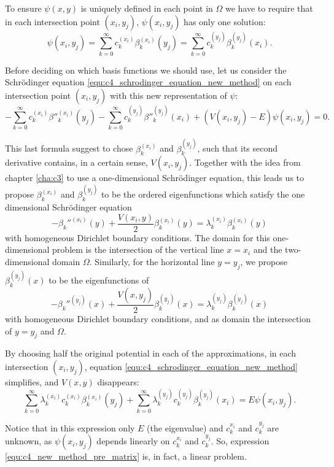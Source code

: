 To ensure $\psi(x, y)$ is uniquely defined in each point in $\Omega$ we have to require that in each intersection point $(x_i, y_j)$, $\psi(x_i, y_j)$ has only one solution:
\begin{equation}\label{equ:c4_new_method_pre_matrix_equality}
    \psi(x_i, y_j) = \sum_{k=0}^\infty c_k^{(x_i)} \beta_k^{(x_i)}(y_j) = \sum_{k=0}^\infty c_k^{(y_j)} \beta_k^{(y_j)}(x_i)\text{.}
\end{equation}

Before deciding on which basis functions we should use, let us consider the Schrödinger equation \eqref{equ:c4_schrodinger_equation_new_method} on each intersection point $(x_i, y_j)$ with this new representation of $\psi$:
$$
    -\sum_{k=0}^\infty c_k^{(x_i)} \beta''^{(x_i)}_k(y_j) - \sum_{k=0}^\infty c_k^{(y_j)} \beta''^{(y_j)}_k(x_i) + (V(x_i, y_j) - E) \psi(x_i, y_j) = 0\text{.}
$$

This last formula suggest to chose $\beta_k^{(x_i)}$ and $\beta_k^{(y_j)}$, such that its second derivative contains, in a certain sense, $V(x_i, y_j)$. Together with the idea from chapter \ref{cha:c3} to use a one-dimensional Schrödinger equation, this leads us to propose $\beta_k^{(x_i)}$ and $\beta_k^{(y_j)}$ to be the ordered eigenfunctions which satisfy the one dimensional Schrödinger equation
$$
    -\beta_k''^{(x_i)}(y) + \frac{V(x_i, y)}{2}\beta_k^{(x_i)}(y) = \lambda_k^{(x_i)} \beta_k^{(x_i)}(y)
$$
with homogeneous Dirichlet boundary conditions. The domain for this one-dimensional problem is the intersection of the vertical line $x = x_i$ and the two-dimensional domain $\Omega$. Similarly, for the horizontal line $y = y_j$, we propose $\beta_k^{(y_j)}(x)$ to be the eigenfunctions of
$$
    -\beta_k''^{(y_j)}(x) + \frac{V(x, y_j)}{2}\beta_k^{(y_j)}(x) = \lambda_k^{(y_j)} \beta_k^{(y_j)}(x)
$$
with homogeneous Dirichlet boundary conditions, and as domain the intersection of $y = y_j$ and $\Omega$.

By choosing half the original potential in each of the approximations, in each intersection $(x_i, y_j)$, equation \eqref{equ:c4_schrodinger_equation_new_method} simplifies, and $V(x, y)$ disappears:
\begin{equation}\label{equ:c4_new_method_pre_matrix}
    \sum_{k=0}^\infty \lambda_k^{(x_i)} c_k^{(x_i)} \beta^{(x_i)}_k(y_j) + \sum_{k=0}^\infty \lambda_k^{(y_j)} c_k^{(y_j)} \beta_k^{(y_j)}(x_i) = E \psi(x_i, y_j) \text{.}
\end{equation}

Notice that in this expression only $E$ (the eigenvalue) and $c_k^{x_i}$ and $c_k^{y_j}$ are unknown, as $\psi(x_i, y_j)$ depends linearly on $c_k^{x_i}$ and $c_k^{y_j}$. So, expression \eqref{equ:c4_new_method_pre_matrix} is, in fact, a linear problem.

